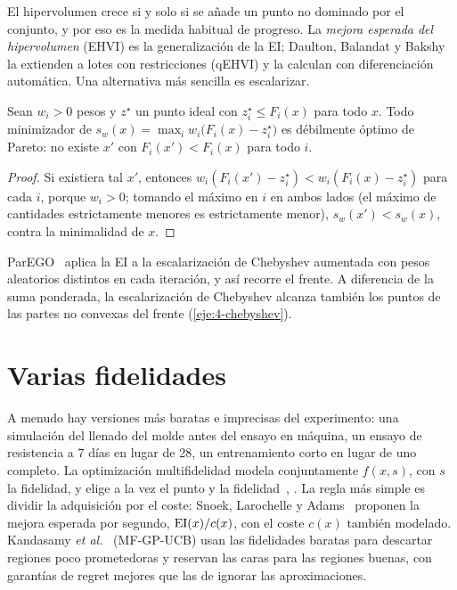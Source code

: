 El hipervolumen crece si y solo si se añade un punto no dominado por el conjunto, y por eso es la medida habitual de progreso. La \emph{mejora esperada del hipervolumen} (EHVI) es la generalización de la EI; Daulton, Balandat y Bakshy~\cite{qehvi} la extienden a lotes con restricciones (qEHVI) y la calculan con diferenciación automática. Una alternativa más sencilla es escalarizar.

\begin{proposicion}\label{prop:chebyshev}
Sean $w_i>0$ pesos y $z^\star$ un punto ideal con $z^\star_i\le F_i(x)$ para todo $x$. Todo minimizador de $s_w(x)=\max_i w_i\bigl(F_i(x)-z^\star_i\bigr)$ es débilmente óptimo de Pareto: no existe $x'$ con $F_i(x')<F_i(x)$ para todo $i$.
\end{proposicion}

\begin{proof}
Si existiera tal $x'$, entonces $w_i(F_i(x')-z_i^\star)<w_i(F_i(x)-z^\star_i)$ para cada $i$, porque $w_i>0$; tomando el máximo en $i$ en ambos lados (el máximo de cantidades estrictamente menores es estrictamente menor), $s_w(x')<s_w(x)$, contra la minimalidad de $x$.
\end{proof}

ParEGO~\cite{parego} aplica la EI a la escalarización de Chebyshev aumentada con pesos aleatorios distintos en cada iteración, y así recorre el frente. A diferencia de la suma ponderada, la escalarización de Chebyshev alcanza también los puntos de las partes no convexas del frente (\cref{eje:4-chebyshev}).

\section{Varias fidelidades}

A menudo hay versiones más baratas e imprecisas del experimento: una simulación del llenado del molde antes del ensayo en máquina, un ensayo de resistencia a 7 días en lugar de 28, un entrenamiento corto en lugar de uno completo. La optimización multifidelidad modela conjuntamente $f(x,s)$, con $s$ la fidelidad, y elige a la vez el punto y la fidelidad~\cite[§11.5]{garnett}, \cite[§5]{frazier}. La regla más simple es dividir la adquisición por el coste: Snoek, Larochelle y Adams~\cite{snoek} proponen la mejora esperada por segundo, $\operatorname{EI}(x)/c(x)$, con el coste $c(x)$ también modelado. Kandasamy \emph{et al.}~\cite{kandasamy} (MF-GP-UCB) usan las fidelidades baratas para descartar regiones poco prometedoras y reservan las caras para las regiones buenas, con garantías de regret mejores que las de ignorar las aproximaciones.

